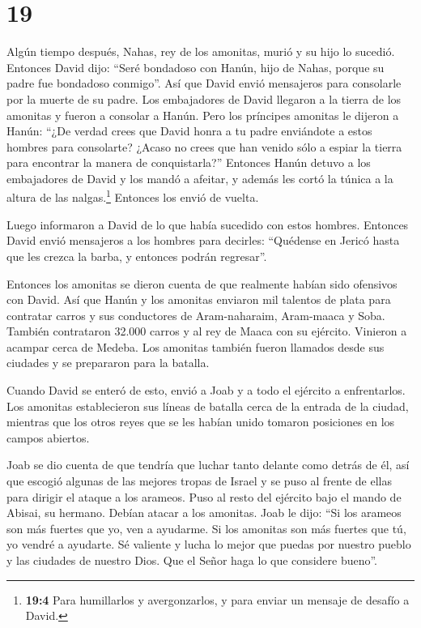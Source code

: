 \hypertarget{section-18}{%
\section{19}\label{section-18}}

 Algún tiempo después, Nahas, rey de los amonitas, murió y
su hijo lo sucedió.  Entonces David dijo: ``Seré bondadoso
con Hanún, hijo de Nahas, porque su padre fue bondadoso conmigo''. Así
que David envió mensajeros para consolarle por la muerte de su padre.
Los embajadores de David llegaron a la tierra de los amonitas y fueron a
consolar a Hanún.  Pero los príncipes amonitas le dijeron a
Hanún: ``¿De verdad crees que David honra a tu padre enviándote a estos
hombres para consolarte? ¿Acaso no crees que han venido sólo a espiar la
tierra para encontrar la manera de conquistarla?''  Entonces
Hanún detuvo a los embajadores de David y los mandó a afeitar, y además
les cortó la túnica a la altura de las nalgas.\footnote{\textbf{19:4}
  Para humillarlos y avergonzarlos, y para enviar un mensaje de desafío
  a David.} Entonces los envió de vuelta.

 Luego informaron a David de lo que había sucedido con estos
hombres. Entonces David envió mensajeros a los hombres para decirles:
``Quédense en Jericó hasta que les crezca la barba, y entonces podrán
regresar''.

 Entonces los amonitas se dieron cuenta de que realmente
habían sido ofensivos con David. Así que Hanún y los amonitas enviaron
mil talentos de plata para contratar carros y sus conductores de
Aram-naharaim, Aram-maaca y Soba.  También contrataron
32.000 carros y al rey de Maaca con su ejército. Vinieron a acampar
cerca de Medeba. Los amonitas también fueron llamados desde sus ciudades
y se prepararon para la batalla.

 Cuando David se enteró de esto, envió a Joab y a todo el
ejército a enfrentarlos.  Los amonitas establecieron sus
líneas de batalla cerca de la entrada de la ciudad, mientras que los
otros reyes que se les habían unido tomaron posiciones en los campos
abiertos.

 Joab se dio cuenta de que tendría que luchar tanto delante
como detrás de él, así que escogió algunas de las mejores tropas de
Israel y se puso al frente de ellas para dirigir el ataque a los
arameos.  Puso al resto del ejército bajo el mando de
Abisai, su hermano. Debían atacar a los amonitas.  Joab le
dijo: ``Si los arameos son más fuertes que yo, ven a ayudarme. Si los
amonitas son más fuertes que tú, yo vendré a ayudarte.  Sé
valiente y lucha lo mejor que puedas por nuestro pueblo y las ciudades
de nuestro Dios. Que el Señor haga lo que considere bueno''.

